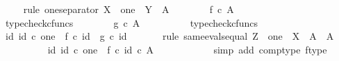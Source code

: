 \begin{isabellebody}
\ \ \ \ \isamarkupfalse%
{\isacharparenleft}{\kern0pt}rule\ one{\isacharunderscore}{\kern0pt}separator{\isacharbrackleft}{\kern0pt}\ X\ {\isacharequal}{\kern0pt}\ one{\isacharcomma}{\kern0pt}\ \ Y\ {\isacharequal}{\kern0pt}\ {\isachardoublequoteopen}A\isactrlbsup {\isasymOmega}\isactrlesup {\isachardoublequoteclose}{\isacharbrackright}{\kern0pt}{\isacharparenright}{\kern0pt}\isanewline
\ \ \ \ \ \ \isamarkupfalse%
\ {\isachardoublequoteopen}f\ {\isasymin}\isactrlsub c\ A\isactrlbsup {\isasymOmega}\isactrlesup {\isachardoublequoteclose}\ \isanewline
\ \ \ \ \ \ \ \ \isamarkupfalse%
\ typecheck{\isacharunderscore}{\kern0pt}cfuncs\isanewline
\ \ \ \ \ \ \isamarkupfalse%
\ {\isachardoublequoteopen}g\ {\isasymin}\isactrlsub c\ A\isactrlbsup {\isasymOmega}\isactrlesup {\isachardoublequoteclose}\isanewline
\ \ \ \ \ \ \ \ \isamarkupfalse%
\ typecheck{\isacharunderscore}{\kern0pt}cfuncs\isanewline
\ \ \ \ \ \ \isamarkupfalse%
\ {\isachardoublequoteopen}{\isasymAnd}id{\isacharunderscore}{\kern0pt}{}{\isachardot}{\kern0pt}\ id{\isacharunderscore}{\kern0pt}{}\ {\isasymin}\isactrlsub c\ one\ {\isasymLongrightarrow}\ f\ {\isasymcirc}\isactrlsub c\ id{\isacharunderscore}{\kern0pt}{}\ {\isacharequal}{\kern0pt}\ g\ {\isasymcirc}\isactrlsub c\ id{\isacharunderscore}{\kern0pt}{}{\isachardoublequoteclose}\isanewline
\ \ \ \ \ \ \isamarkupfalse%
{\isacharparenleft}{\kern0pt}rule\ same{\isacharunderscore}{\kern0pt}evals{\isacharunderscore}{\kern0pt}equal{\isacharbrackleft}{\kern0pt}\ Z\ {\isacharequal}{\kern0pt}\ one{\isacharcomma}{\kern0pt}\ \ X\ {\isacharequal}{\kern0pt}\ A{\isacharcomma}{\kern0pt}\ \ A\ {\isacharequal}{\kern0pt}\ {\isasymOmega}{\isacharbrackright}{\kern0pt}{\isacharparenright}{\kern0pt}\isanewline
\ \ \ \ \ \ \ \ \isamarkupfalse%
\ {\isachardoublequoteopen}{\isasymAnd}id{\isacharunderscore}{\kern0pt}{}{\isachardot}{\kern0pt}\ id{\isacharunderscore}{\kern0pt}{}\ {\isasymin}\isactrlsub c\ one\ {\isasymLongrightarrow}\ f\ {\isasymcirc}\isactrlsub c\ id{\isacharunderscore}{\kern0pt}{}\ {\isasymin}\isactrlsub c\ A\isactrlbsup {\isasymOmega}\isactrlesup {\isachardoublequoteclose}\isanewline
\ \ \ \ \ \ \ \ \ \ \isamarkupfalse%
\ {\isacharparenleft}{\kern0pt}simp\ add{\isacharcolon}{\kern0pt}\ comp{\isacharunderscore}{\kern0pt}type\ f{\isacharunderscore}{\kern0pt}type{\isacharparenright}{\kern0pt}\isanewline

\end{isabellebody}
